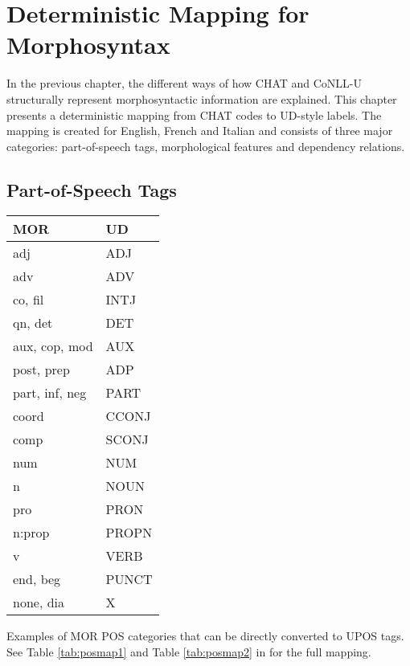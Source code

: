 \chapter{Deterministic Mapping for Morphosyntax} %
\label{Chapter4}

In the previous chapter, the different ways of how CHAT and CoNLL-U structurally represent morphosyntactic information are explained. This chapter presents a deterministic mapping from CHAT codes to UD-style labels. The mapping is created for English, French and Italian and consists of three major categories: part-of-speech tags, morphological features and dependency relations.


\section{Part-of-Speech Tags}
\label{sec:pos}
\begin{margintable}[1\baselineskip] %
\begin{tabularx}{\textwidth}{@{}Ll@{}}
\toprule
\textbf{MOR} & \textbf{UD}\\ \midrule
adj & ADJ\\
adv & ADV\\
co, fil & INTJ\\
qn, det & DET\\
aux, cop, mod & AUX\\
post, prep & ADP\\
part, inf, neg & PART\\
coord & CCONJ\\
comp & SCONJ\\
num & NUM\\
n & NOUN\\
pro & PRON\\
n:prop & PROPN\\
v & VERB\\
end, beg & PUNCT\\
none, dia & X\\\bottomrule
\end{tabularx}
\caption{\label{tab:martabpos}Examples of MOR POS categories that can be directly converted to UPOS tags. See Table \ref{tab:posmap1} and Table \ref{tab:posmap2} in  for the full mapping.}
\footnotesize
\end{margintable}


